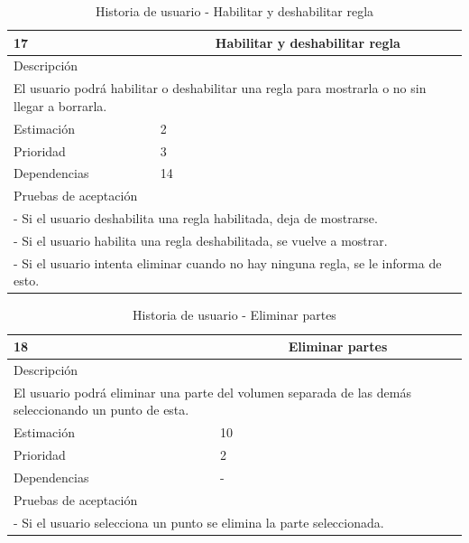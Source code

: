 \begin{table}[H]
	\begin{center}
		\begin{tabular} {|l|c|l|}
			\hline
			17 & \multicolumn{2}{c|}{Habilitar y deshabilitar regla} \\ \hline \hline
			\multicolumn{3}{|l|}{Descripción} \\ \hline
			\multicolumn{3}{|p{12cm}|}{El usuario podrá habilitar o deshabilitar una regla para mostrarla o no sin llegar a borrarla.} \\ \hline
			\multicolumn{2}{|l|}{Estimación} & 2 \\ \hline
			\multicolumn{2}{|l|}{Prioridad} & 3 \\ \hline
			\multicolumn{2}{|l|}{Dependencias} & 14 \\ \hline
			\multicolumn{3}{|l|}{Pruebas de aceptación} \\ \hline
			\multicolumn{3}{|p{12cm}|}{ - Si el usuario deshabilita una regla habilitada, deja de mostrarse.} \\
			\multicolumn{3}{|p{12cm}|}{ - Si el usuario habilita una regla deshabilitada, se vuelve a mostrar.} \\
			\multicolumn{3}{|p{12cm}|}{ - Si el usuario intenta eliminar cuando no hay ninguna regla, se le informa de esto.} \\ \hline
		\end{tabular}
	\end{center}
	\caption{Historia de usuario - Habilitar y deshabilitar regla}
	\label{tab:hu_habilitar_y_deshabilitar_regla}
\end{table}

\begin{table}[H]
	\begin{center}
		\begin{tabular} {|l|c|l|}
			\hline
			18 & \multicolumn{2}{c|}{Eliminar partes} \\ \hline \hline
			\multicolumn{3}{|l|}{Descripción} \\ \hline
			\multicolumn{3}{|p{12cm}|}{El usuario podrá eliminar una parte del volumen separada de las demás seleccionando un punto de esta.} \\ \hline
			\multicolumn{2}{|l|}{Estimación} & 10 \\ \hline
			\multicolumn{2}{|l|}{Prioridad} & 2 \\ \hline
			\multicolumn{2}{|l|}{Dependencias} & - \\ \hline
			\multicolumn{3}{|l|}{Pruebas de aceptación} \\ \hline
			\multicolumn{3}{|p{12cm}|}{ - Si el usuario selecciona un punto se elimina la parte seleccionada.} \\ \hline
		\end{tabular}
	\end{center}
	\caption{Historia de usuario - Eliminar partes}
	\label{tab:hu_eliminar_partes}
\end{table}